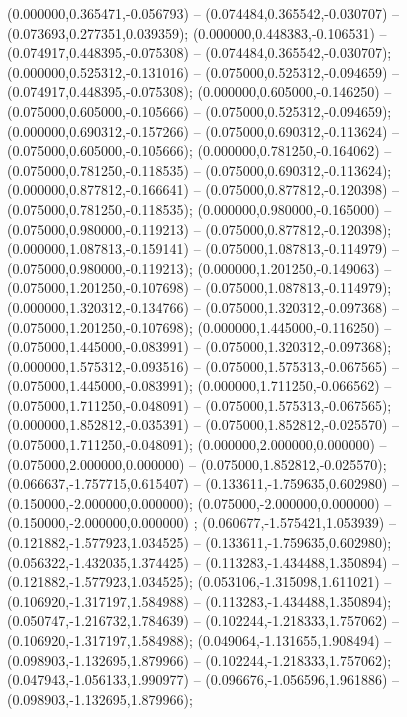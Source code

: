  (0.000000,0.365471,-0.056793) -- (0.074484,0.365542,-0.030707) -- (0.073693,0.277351,0.039359);
 (0.000000,0.448383,-0.106531) -- (0.074917,0.448395,-0.075308) -- (0.074484,0.365542,-0.030707);
 (0.000000,0.525312,-0.131016) -- (0.075000,0.525312,-0.094659) -- (0.074917,0.448395,-0.075308);
 (0.000000,0.605000,-0.146250) -- (0.075000,0.605000,-0.105666) -- (0.075000,0.525312,-0.094659);
 (0.000000,0.690312,-0.157266) -- (0.075000,0.690312,-0.113624) -- (0.075000,0.605000,-0.105666);
 (0.000000,0.781250,-0.164062) -- (0.075000,0.781250,-0.118535) -- (0.075000,0.690312,-0.113624);
 (0.000000,0.877812,-0.166641) -- (0.075000,0.877812,-0.120398) -- (0.075000,0.781250,-0.118535);
 (0.000000,0.980000,-0.165000) -- (0.075000,0.980000,-0.119213) -- (0.075000,0.877812,-0.120398);
 (0.000000,1.087813,-0.159141) -- (0.075000,1.087813,-0.114979) -- (0.075000,0.980000,-0.119213);
 (0.000000,1.201250,-0.149063) -- (0.075000,1.201250,-0.107698) -- (0.075000,1.087813,-0.114979);
 (0.000000,1.320312,-0.134766) -- (0.075000,1.320312,-0.097368) -- (0.075000,1.201250,-0.107698);
 (0.000000,1.445000,-0.116250) -- (0.075000,1.445000,-0.083991) -- (0.075000,1.320312,-0.097368);
 (0.000000,1.575312,-0.093516) -- (0.075000,1.575313,-0.067565) -- (0.075000,1.445000,-0.083991);
 (0.000000,1.711250,-0.066562) -- (0.075000,1.711250,-0.048091) -- (0.075000,1.575313,-0.067565);
 (0.000000,1.852812,-0.035391) -- (0.075000,1.852812,-0.025570) -- (0.075000,1.711250,-0.048091);
 (0.000000,2.000000,0.000000) -- (0.075000,2.000000,0.000000) -- (0.075000,1.852812,-0.025570);
 (0.066637,-1.757715,0.615407) -- (0.133611,-1.759635,0.602980) -- (0.150000,-2.000000,0.000000);
 (0.075000,-2.000000,0.000000) -- (0.150000,-2.000000,0.000000) ;
 (0.060677,-1.575421,1.053939) -- (0.121882,-1.577923,1.034525) -- (0.133611,-1.759635,0.602980);
 (0.056322,-1.432035,1.374425) -- (0.113283,-1.434488,1.350894) -- (0.121882,-1.577923,1.034525);
 (0.053106,-1.315098,1.611021) -- (0.106920,-1.317197,1.584988) -- (0.113283,-1.434488,1.350894);
 (0.050747,-1.216732,1.784639) -- (0.102244,-1.218333,1.757062) -- (0.106920,-1.317197,1.584988);
 (0.049064,-1.131655,1.908494) -- (0.098903,-1.132695,1.879966) -- (0.102244,-1.218333,1.757062);
 (0.047943,-1.056133,1.990977) -- (0.096676,-1.056596,1.961886) -- (0.098903,-1.132695,1.879966);
